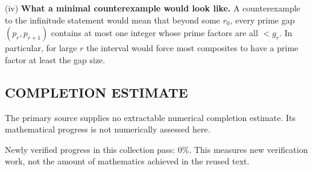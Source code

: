 (iv) \textbf{What a minimal counterexample would look like.}
A counterexample to the infinitude statement would mean that beyond some $r_0$, every prime gap $(p_r,p_{r+1})$ contains at most one integer whose prime factors are all $<g_r$. In particular, for large $r$ the interval would force most composites to have a prime factor at least the gap size.




\subsection*{COMPLETION ESTIMATE}
The primary source supplies no extractable numerical completion estimate. Its mathematical progress is not numerically assessed here.

Newly verified progress in this collection pass: $0\%$. This measures new verification work, not the amount of mathematics achieved in the reused text.
